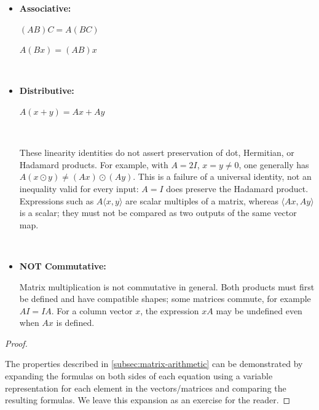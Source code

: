 \begin{tcolorbox}[title={\textbf{\tboxtheorem{\ref*{subsec:matrix-arithmetic}} Matrix Arithmetic Properties}}]

\begin{itemize}

\item \textbf{Associative:} 

$(AB)C = A(BC)$

$A(Bx) = (AB)x$


$ $

 
\item \textbf{Distributive:} 

$A(x + y) = Ax + Ay$




$ $

These linearity identities do not assert preservation of dot, Hermitian, or Hadamard products. For example, with $A=2I$, $x=y\ne0$, one generally has $A(x\odot y)\ne(Ax)\odot(Ay)$. This is a failure of a universal identity, not an inequality valid for every input: $A=I$ does preserve the Hadamard product. Expressions such as $A\langle x,y\rangle$ are scalar multiples of a matrix, whereas $\langle Ax,Ay\rangle$ is a scalar; they must not be compared as two outputs of the same vector map.

$ $

\item \textbf{NOT Commutative:} 

Matrix multiplication is not commutative in general. Both products must first be defined and have compatible shapes; some matrices commute, for example $AI=IA$. For a column vector $x$, the expression $xA$ may be undefined even when $Ax$ is defined.


\end{itemize}
\end{tcolorbox}

\begin{proof}

$ $

The properties described in \ref*{subsec:matrix-arithmetic} can be demonstrated by expanding the formulas on both sides of each equation using a variable representation for each element in the vectors/matrices and comparing the resulting formulas. We leave this expansion as an exercise for the reader.

\end{proof}


